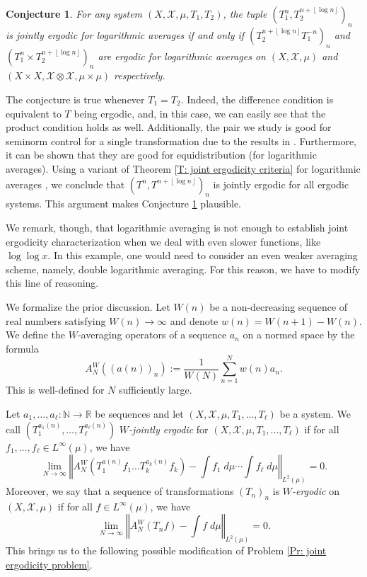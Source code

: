 \documentclass[11pt]{amsart}
\newtheorem{conjecture}[lemma]{Conjecture}
\theoremstyle{definition}
\newcommand{\N}{{\mathbb N}}
\newcommand{\R}{{\mathbb R}}
\newcommand{\CX}{{\mathcal X}}
\newcommand{\norm}[1]{\left\Vert #1\right\Vert}
\newcommand{\1}{{\mathbf{1}}}
\newcommand{\floor}[1]{{\left \lfloor #1 \right \rfloor}}
\begin{document}
\begin{conjecture}\label{Conj: log averaged counterexample}
    For any system $(X,\CX, \mu,T_1,T_2)$, the tuple $(T_1^n,T_2^{n+\floor{\log n}})_{n}$ is jointly ergodic for logarithmic averages if and only if $(T_2^{n+\floor{\log n}}T_1^{-n})_{n}$ and $(T_1^{n}\times T_2^{n+\floor{\log n}})_{n}$ are ergodic for logarithmic averages on $(X, \CX, \mu)$ and $(X\times X, \CX\otimes \CX, \mu\times\mu)$ respectively.
\end{conjecture}
The conjecture is true whenever $T_1=T_2$. Indeed, the difference condition is equivalent to $T$ being ergodic, and, in this case, we can easily see that the product condition holds as well. 
Additionally, the pair we study is good for seminorm control for a single transformation due to the results in \cite{BMR20}. Furthermore, it can be shown that they are good for equidistribution (for logarithmic averages). Using a variant of Theorem \ref{T: joint ergodicity criteria} for logarithmic averages \cite[Theorem 2.19]{FrKu22a}, we conclude that $(T^n, T^{n+\floor{\log n}})_{n}$ is jointly ergodic for all ergodic systems. This argument makes Conjecture \ref{Conj: log averaged counterexample} plausible.

We remark, though, that logarithmic averaging is not enough to establish joint ergodicity characterization when we deal with even slower functions, like $\log\log x$. In this example, one would need to consider an even weaker averaging scheme, namely, double logarithmic averaging. For this reason, we have to modify this line of reasoning.

We formalize the prior discussion.
Let $W(n)$ be a non-decreasing sequence of real numbers satisfying $W(n)\to\infty$ and denote $w(n)=W(n+1)-W(n)$. We define the $W$-averaging operators of a sequence $a_n$ on a normed space by the formula\begin{equation*}
   A^W_{N}\left(\left(a(n)\right)_{n}\right) :=\frac{1}{W(N)}\sum_{n=1}^N w(n)a_n.
\end{equation*}This is well-defined for $N$ sufficiently large.

Let $a_1,\ldots,a_\ell:\N\to \R$ be sequences and let $(X,\CX,\mu,T_1,\ldots, T_\ell)$ be a system.
We call $(T_1^{a_1(n)},\ldots,T_\ell^{a_\ell(n)})$  {\em $W$-jointly ergodic} for $(X,\CX,\mu,T_1,\ldots, T_\ell)$ if for all $f_1,\ldots, f_\ell\in L^{\infty}(\mu)$, we have 
\begin{equation*}
    \lim_{N\to\infty} \norm{A^W_{N}(T_1^{a(n)}f_1\ldots T_k^{a_k(n)}f_k)-\int f_1\; d\mu\cdots\int f_\ell\; d\mu}_{L^2(\mu)}=0.
\end{equation*}
Moreover, we say that a sequence of transformations $(T_n)_n$ is {\em $W$-ergodic} on $(X,\CX,\mu)$ if for all $f\in L^{\infty}(\mu)$, we have
\begin{equation*}
    \lim_{N\to\infty} \norm{A^W_{N}(T_n f)-\int f\; d\mu }_{L^2(\mu)}=0.
\end{equation*}
This brings us to the following possible modification of Problem \ref{Pr: joint ergodicity problem}.
\end{document}
